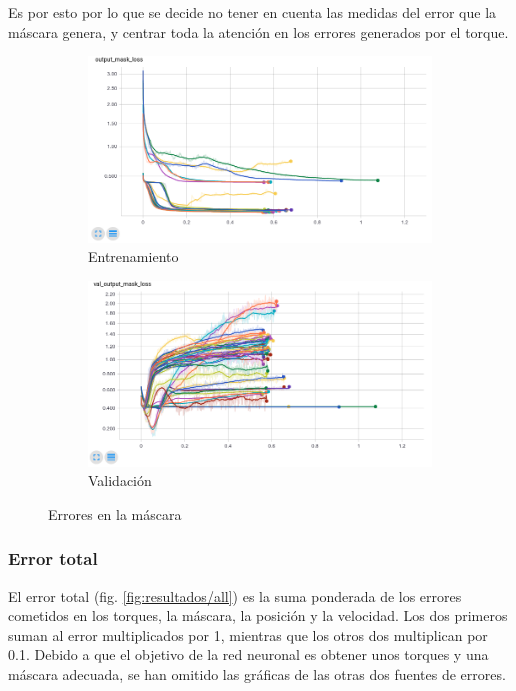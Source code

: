 Es por esto por lo que se decide no tener en cuenta las medidas del error que la máscara genera, y centrar toda la atención en los errores generados por el torque.

\begin{figure}[thb]
	\begin{subfigure}[b]{0.45\textwidth}
		\centering
		\includegraphics[width=\linewidth]{imagenes/resultados/mask_loss_all.png}
		\caption{Entrenamiento}
		\label{fig:resultados/mask_loss_all}
	\end{subfigure}
	\begin{subfigure}[b]{0.45\textwidth}
		\centering
		\includegraphics[width=\linewidth]{imagenes/resultados/val_mask_loss_all.png}
		\caption{Validación}
		\label{fig:resultados/val_mask_loss_all}
	\end{subfigure}
	\caption{Errores en la máscara}
	\label{fig:resultados/mask_all}
\end{figure}

\subsubsection{Error total}
El error total (fig. \ref{fig:resultados/all}) es la suma ponderada de los errores cometidos en los torques, la máscara, la posición y la velocidad. Los dos primeros suman al error multiplicados por 1, mientras que los otros dos multiplican por 0.1. Debido a que el objetivo de la red neuronal es obtener unos torques y una máscara adecuada, se han omitido las gráficas de las otras dos fuentes de errores.

